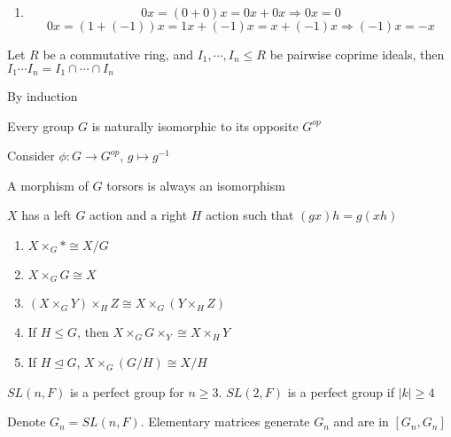\documentclass[main]{subfiles}
\begin{document}
\begin{solution}
\begin{enumerate}[label=\textbf{\arabic*.}, leftmargin=*]
\item\[0x=(0+0)x=0x+0x\Rightarrow 0x=0\]
\[0x=(1+(-1))x=1x+(-1)x=x+(-1)x\Rightarrow (-1)x=-x\]
\end{enumerate}
\end{solution}

\begin{exercise}
Let $R$ be a commutative ring, and $I_1,\cdots, I_n\leq R$ be pairwise coprime ideals, then $I_1\cdots I_n=I_1\cap\cdots\cap I_n$
\end{exercise}

\begin{solution}
By induction
\end{solution}

\begin{exercise}
Every group $G$ is naturally isomorphic to its opposite $G^{op}$
\end{exercise}

\begin{solution}
Consider $\phi:G\to G^{op}$, $g\mapsto g^{-1}$
\end{solution}

\begin{exercise}
A morphism of $G$ torsors is always an isomorphism
\end{exercise}

\begin{exercise}
$X$ has a left $G$ action and a right $H$ action such that $(gx)h=g(xh)$
\begin{enumerate}[label=\textbf{\arabic*.}, leftmargin=*]
\item $X\times_G*\cong X/G$ 
\item $X\times_GG\cong X$
\item $(X\times_GY)\times_HZ\cong X\times_G(Y\times_HZ)$ 
\item If $H\leq G$, then $X\times_GG\times_Y\cong X\times_HY$ 
\item If $H\trianglelefteq G$, $X\times_G(G/H)\cong X/H$
\end{enumerate}
\end{exercise}

\begin{exercise}
$SL(n,F)$ is a perfect group for $n\geq3$. $SL(2,F)$ is a perfect group if $|k|\geq4$
\end{exercise}

\begin{solution}
Denote $G_n=SL(n,F)$. Elementary matrices generate $G_n$ and are in $[G_n,G_n]$
\end{solution}
\end{document}
